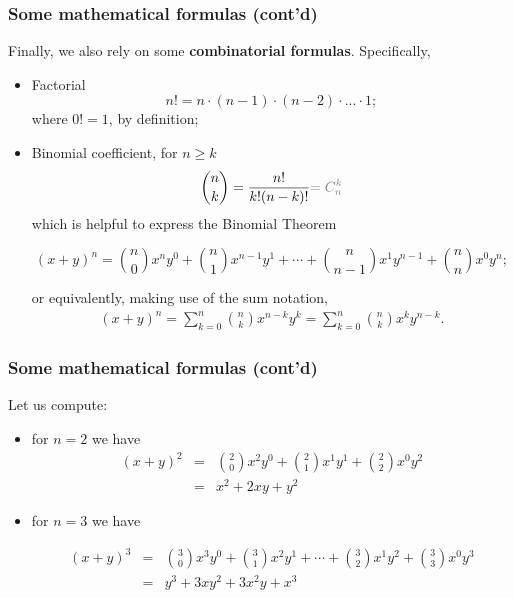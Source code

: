 \documentclass[notes=show,handout]{beamer}
\newcommand{\bea}{\begin{eqnarray}}
\newcommand{\eea}{\end{eqnarray}}
\begin{document}
\begin{frame}
\frametitle{Some mathematical formulas (cont'd)}

Finally, we also rely on some \textbf{combinatorial formulas}. Specifically,

\begin{itemize}
\item Factorial 
$$
n! = n \cdot (n-1) \cdot (n-2) \cdot ... \cdot 1;
$$
where $0! =1$, by definition;
\item Binomial coefficient, for $n \geq k$
$$ 
\binom n k =\frac{n!}{k!(n-k)!} \color{gray}{=C^{k}_n}\color{black}
$$
which is helpful to express the \color{blue} Binomial Theorem \color{black}
\begin{small}
$$(x+y)^n = {n \choose 0}x^n y^0 + {n \choose 1}x^{n-1}y^1 + \cdots + {n \choose n-1}x^1 y^{n-1} + {n \choose n}x^0 y^n;$$
\end{small}
or equivalently, making use of the sum notation,
\bea
(x+y)^n = \sum_{k=0}^n {n \choose k}x^{n-k}y^k = \sum_{k=0}^n {n \choose k}x^{k}y^{n-k}. \nonumber
\eea
\end{itemize}

\end{frame}

\begin{frame}
\frametitle{Some mathematical formulas (cont'd)}

\begin{example}
Let us compute:
\begin{small}
\begin{itemize} 



\item for $n=2$ we have 
\bea
(x+y)^2 &=& {2 \choose 0}x^2 y^0 + {2 \choose 1}x^{1}y^1 +  {2 \choose 2}x^0 y^{2} \nonumber \\  
  &=&  x^2 +  2 x y +  y^{2} \nonumber
\eea


\item for $n=3$ we have 

\begin{small}
\bea
(x+y)^3 &=& {3 \choose 0}x^3 y^0 + {3 \choose 1}x^{2}y^1 + \cdots + {3 \choose 2}x^1 y^{2} + {3 \choose 3}x^0 y^3 \nonumber \\
&=& y^3 + 3xy^2 + 3x^2y+x^3 \nonumber 
\eea
\end{small}

\end{itemize} 
\end{small}


\end{example}


\end{frame}
\end{document}
